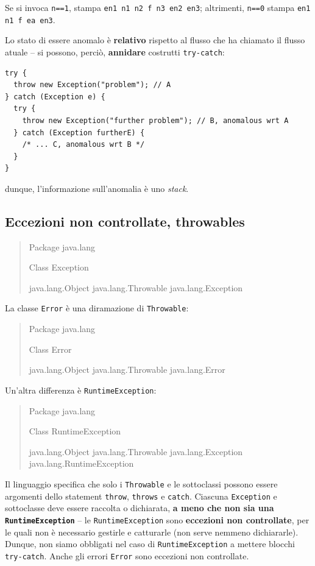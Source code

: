 \documentclass[\fontsizeclass,twocolumn]{\classname}
\theoremstyle{definition}
\theoremstyle{definition}
\begin{document}
Se si invoca \texttt{n==1}, stampa \texttt{en1 n1 n2 f n3 en2 en3}; altrimenti,
\texttt{n==0} stampa \texttt{en1 n1 f ea en3}.

Lo stato di essere anomalo è \textbf{relativo} rispetto al flusso che ha
chiamato il flusso atuale -- si possono, perciò, \textbf{annidare} costrutti
\texttt{try\--catch}:

\begin{lstlisting}
try {  
  throw new Exception("problem"); // A
} catch (Exception e) {
  try {
    throw new Exception("further problem"); // B, anomalous wrt A
  } catch (Exception furtherE) {
    /* ... C, anomalous wrt B */
  }
}
\end{lstlisting}

dunque, l'informazione sull'anomalia è uno \emph{stack}.

\subsection{Eccezioni non controllate, throwables}


\begin{quote}
    \footnotesize{Package java.lang

Class Exception

java.lang.Object
java.lang.Throwable
java.lang.Exception
}
\end{quote}

La classe \texttt{Error} è una diramazione di \texttt{Throwable}: 

\begin{quote}
    \footnotesize{Package java.lang

Class Error

java.lang.Object
java.lang.Throwable
java.lang.Error
}
\end{quote}

Un'altra differenza è \texttt{Runtime\-Exception}:

\begin{quote}
    \footnotesize{Package java.lang

Class Runtime\-Exception

java.lang.Object
java.lang.Throwable
java.lang.Exception
java.lang.Runtime\-Exception
}
\end{quote}

Il linguaggio specifica che solo i \texttt{Throwable} e le sottoclassi possono
essere argomenti dello statement \texttt{throw}, \texttt{throws} e
\texttt{catch}. Ciascuna \texttt{Exception} e sottoclasse deve essere raccolta
o dichiarata, \textbf{a meno che non sia una \texttt{Runtime\-Exception}} -- le
\texttt{Runtime\-Exception} sono \textbf{eccezioni non controllate}, per le quali
non è necessario gestirle e catturarle (non serve nemmeno dichiararle). Dunque,
non siamo obbligati nel caso di \texttt{Runtime\-Exception} a mettere blocchi
\texttt{try\--catch}. Anche gli errori \texttt{Error} sono eccezioni non
controllate.
\end{document}
